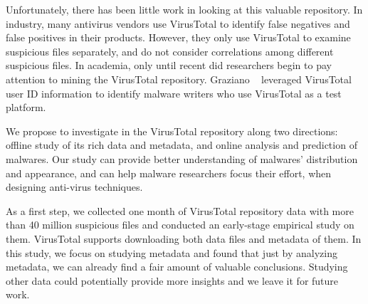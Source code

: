 

Unfortunately, there has been little work in looking at this valuable repository.
In industry, many antivirus vendors use VirusTotal to identify false negatives 
and false positives in their products. 
However, they only use VirusTotal to examine suspicious files separately, 
and do not consider correlations among different suspicious files. 
In academia, only until recent did researchers begin to pay attention to mining the VirusTotal repository. 
Graziano \etal~\cite{neeles} leveraged VirusTotal user ID information to identify malware writers 
who use VirusTotal as a test platform. 



We propose to investigate in the VirusTotal repository along two directions:
offline study of its rich data and metadata, 
and online analysis and prediction of malwares.
Our study can provide better understanding of malwares’ distribution and appearance, 
and can help malware researchers focus their effort, when designing anti-virus techniques.

As a first step, we collected one month of VirusTotal repository data with more than 40 million suspicious files
and conducted an early-stage empirical study on them. 
VirusTotal supports downloading both data files and metadata of them.
In this study, we focus on studying metadata and found that just by analyzing metadata, 
we can already find a fair amount of valuable conclusions.
Studying other data could potentially provide more insights and we leave it for future work.

